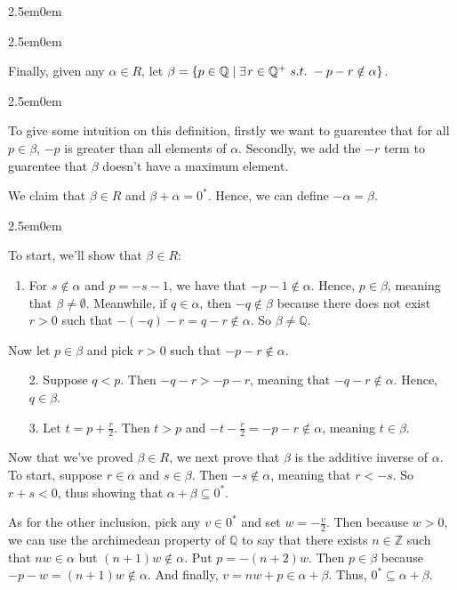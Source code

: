 \documentclass{book}
\newcommand{\myComment}{%
   \color{RawerSienna}%
   \fontsize{12}{14}\selectfont%
}
\newcommand{\exP}{%
   \color{Purple}%
   \fontsize{12}{14}\selectfont%
}
\newenvironment{myIndent}{%
   \begin{adjustwidth}{2.5em}{0em}%
}{%
   \end{adjustwidth}%
}
\newcommand{\suchthat}{ \hspace{0.3em}s.t.\hspace{0.3em}}
\newcommand{\retTwo}{\hfill\bigbreak}
\begin{document}
\begin{myIndent}
\begin{myIndent}
         Finally, given any $\alpha \in R$, let $\beta = \{p \in \mathbb{Q} \mid \exists\hspace{0.1em} r \in \mathbb{Q}^+ \suchthat -p-r \notin \alpha\}$.
         \begin{myIndent}\myComment
            To give some intuition on this definition, firstly we want to guarentee that for all $p \in \beta$, $-p$ is greater than all elements of $\alpha$. Secondly, we add the $-r$ term to guarentee that $\beta$ doesn't have a maximum element.\\
         \end{myIndent}

         We claim that $\beta \in R$ and $\beta + \alpha = 0^*$. Hence, we can define $-\alpha = \beta$.

         \begin{myIndent}\exP
            To start, we'll show that $\beta \in R$:
            \begin{enumerate}
               \item For $s \notin \alpha$ and $p = -s - 1$, we have that $-p - 1 \notin \alpha$. Hence, $p \in \beta$, meaning that $\beta \neq \emptyset$. Meanwhile, if $q \in \alpha$, then $-q \notin \beta$ because there does not exist $r > 0$ such that $-(-q) - r = q - r \notin \alpha$. So $\beta \neq \mathbb{Q}$.\\ [-6pt]
            \end{enumerate}

            Now let $p \in \beta$ and pick $r > 0$ such that $-p -r \notin \alpha$.\newpage

            \begin{enumerate}
               \item[2.] Suppose $q < p$. Then $-q - r > -p - r$, meaning that $-q - r \notin \alpha$. Hence, $q \in \beta$.\retTwo
               
               \item[3.] Let $t = p + \frac{r}{2}$. Then $t > p$ and $-t - \frac{r}{2} = -p - r \notin \alpha$, meaning $t \in \beta$.\retTwo
            \end{enumerate}

            Now that we've proved $\beta \in R$, we next prove that $\beta$ is the additive inverse of $\alpha$. To start, suppose $r \in \alpha$ and $s \in \beta$. Then $-s \notin \alpha$, meaning that $r < -s$. So $r + s < 0$, thus showing that $\alpha + \beta \subseteq 0^*$.\retTwo

            As for the other inclusion, pick any $v \in 0^*$ and set $w = -\frac{v}{2}$. Then because $w > 0$, we can use the archimedean property of $\mathbb{Q}$ to say that there exists $n \in \mathbb{Z}$ such that $nw \in \alpha$ but $(n+1)w \notin \alpha$. Put $p = -(n + 2)w$. Then $p \in \beta$ because $-p - w = (n+1)w
            \notin \alpha$. And finally, $v = nw + p \in \alpha + \beta$. Thus, $0^* \subseteq \alpha + \beta$.\retTwo
         \end{myIndent}
      \end{myIndent}
   \end{myIndent}
\end{document}
